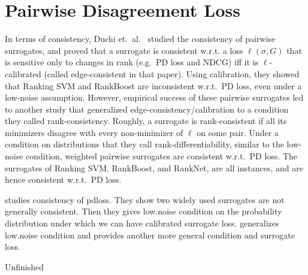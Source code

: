 \section{Pairwise Disagreement Loss}\label{sec:pdloss}


In terms of consistency, Duchi et.\ al.~\cite{duchi2010ranking}
studied the consistency of pairwise
surrogates, and proved that a surrogate is consistent w.r.t. a
loss $\ell(\sigma, G)$ that is sensitive only to changes in rank
(e.g.\ PD loss and NDCG) iff it is $\ell$-calibrated (called edge-consistent
in that paper). Using calibration, they showed that Ranking SVM and RankBoost
are inconsistent w.r.t.\ PD loss, even under a low-noise assumption.
However, empirical success of these pairwise surrogates led to another study
that generalized edge-consistency/calibration to a condition they called
rank-consistency.
Roughly, a surrogate is rank-consistent if all its minimizers
disagree with every non-minimizer of $\ell$ on some pair. Under a condition
on distributions that they call rank-differentiability,
similar to the low-noise condition, weighted pairwise surrogates are consistent
w.r.t.\ PD loss. The surrogates of Ranking SVM, RankBoost, and RankNet, are
all instances, and are hence consistent w.r.t.\ PD loss.


\cite{duchi2010ranking} studies consistency of pdloss. They show two widely used surrogates are not generally consistent. Then they gives low.noise condition on the probability distribution under which we can have calibrated surrogate loss. \cite{ramaswamy2013convex} generalizes low.noise condition and provides another more general condition and surrogate loss. 

Unfinished
